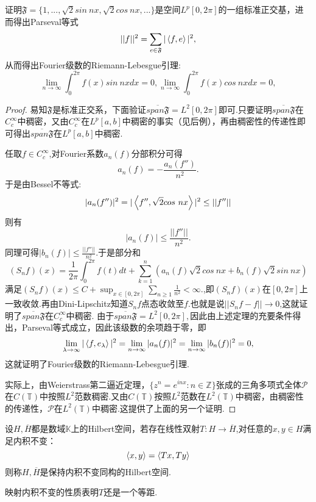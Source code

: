 \documentclass[lang=cn,10pt]{elegantbook}
\begin{document}
	\begin{example}
		证明\(\mathfrak{F}=\{1,...,\sqrt{2}sin\ nx,\sqrt{2}cos\ nx,...\}\)是空间\(L^p[0,2\pi]\)的一组标准正交基，进而得出Parseval等式
		\[||f||^2=\sum_{e\in \mathfrak{F}}|\Braket{f,e}|^2,\]
		从而得出Fourier级数的Riemann-Lebesgue引理:
		\[\lim_{n\to \infty}\int_0^{2\pi}f(x)sin\ nxdx=0,\lim_{n\to \infty}\int_0^{2\pi}f(x)cos\ nxdx=0,\]
		\begin{proof}
			易知\(\mathfrak{F}\)是标准正交系，下面验证\(\overline{span\mathfrak{F}}=L^2[0,2\pi]\)即可.只要证明\(\overline{span\mathfrak{F}}\)在\(C_c^\infty\)中稠密，又由\(C_c^\infty\)在\(L^p[a,b]\)中稠密的事实（见后例），再由稠密性的传递性即可得出\(\overline{span\mathfrak{F}}\)在\(L^p[a,b]\)中稠密.
			
			任取\(f \in C_c^\infty\),对Fourier系数\(a_n(f)\)分部积分可得
			\[a_n(f)=-\frac{a_n(f'')}{n^2}.\]
			于是由Bessel不等式:
			\[|a_n(f'')|^2=|\Braket{f'',\sqrt{2}cos\ nx}|^2\le ||f''||\]
			则有
			\[|a_n(f)|\le \frac{||f''||}{n^2}.\]
			同理可得\(|b_n(f)|\le \frac{||f''||}{n^2}.\)于是部分和
			\[(S_nf)(x)=\frac{1}{2\pi}\int_0^{2\pi}f(t)dt+\sum_{k=1}^n(a_n(f)\sqrt{2}cos\ nx+b_n(f)\sqrt{2}sin\ nx)\]
			满足\((S_nf)(x)\le C+\sup_{x\in[0,2\pi]}\sum_{n\ge 1}\frac{1}{n^2}<\infty.\),即\((S_nf)(x)\)在\([0,2\pi]\)上一致收敛.再由Dini-Lipschitz知道\(S_nf\)点态收敛至\(f\).也就是说\(||S_nf-f||\to 0\),这就证明了\(\overline{span\mathfrak{F}}\)在\(C_c^\infty\)中稠密.
			由于\(\overline{span\mathfrak{F}}=L^2[0,2\pi],\)因此由上述定理的充要条件得出，Parseval等式成立，因此该级数的余项趋于零，即
			\[\lim_{\lambda\to \infty}|\Braket{f,e_\lambda}|^2=\lim_{n\to \infty}|a_n(f)|^2=\lim_{n\to \infty}|b_n(f)|^2=0,\]
			这就证明了Fourier级数的Riemann-Lebesgue引理.
			
			实际上，由Weierstrass第二逼近定理，\(\{z^n=e^{inx}:n\in \mathbb{Z}\}\)张成的三角多项式全体\(\mathcal{P}\)在\(C(\mathbb{T})\)中按照\(L^2\)范数稠密.又由\(C(\mathbb{T})\)按照\(L^2\)范数在\(L^2(\mathbb{T})\)中稠密，由稠密性的传递性，\(\mathcal{P}\)在\(L^2(\mathbb{T})\)中稠密.这提供了上面的另一个证明.
		\end{proof}
	\end{example}
	\begin{definition}[Hilbert空间的同构]
		设\(H,\overline{H}\)都是数域\(\mathbb{K}\)上的Hilbert空间，若存在线性双射\(T:H \longrightarrow \overline{H}\),对任意的\(x,y\in H\)满足内积不变：
		\[\Braket{x,y}=\Braket{Tx,Ty}\]
		则称\(H,\overline{H}\)是保持内积不变同构的Hilbert空间.
	\end{definition}
	\begin{note}
		映射内积不变的性质表明\(T\)还是一个等距.
	\end{note}
\end{document}
